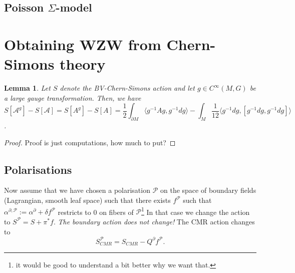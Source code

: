 \documentclass[a4paper,reqno]{amsart}
\newtheorem{lemma}[definition]{Lemma}
\newcommand{\calA}{\mathcal{A}}
\newcommand{\calP}{\mathcal{P}}
\newcommand{\de}{\partial}
\begin{document}
\subsection{Poisson $\Sigma$-model}

\section{Obtaining WZW from Chern-Simons theory}
 \begin{lemma}
 Let $S$ denote the BV-Chern-Simons action and let $g \in C^{\infty}(M,G)$ be a large gauge transformation. Then, we have $$S[\calA^g] - S[\calA] = S[A^g] - S[A] = \frac{1}{2}\int_{\de M} \langle g^{-1}Ag, g^{-1}dg \rangle -\int_M \frac{1}{12}\langle g^{-1}dg,[g^{-1}dg,g^{-1}dg]\rangle$$. 
\end{lemma}
\begin{proof}
Proof is just computations, how much to put?
\end{proof}
\subsection{Polarisations} 
Now assume that we have chosen a polarisation $\calP$ on the space of boundary fields (Lagrangian, smooth leaf space) such that there exists $f^{\calP}$ such that $\alpha^{\de,\calP} := \alpha^{\de} + \delta f^{\calP}$ restricts to 0 on fibers of $\calP$\footnote{it would be good to understand a bit better why we want that.} In that case we change the action to $S^{\calP} = S + \pi^*f$. \emph{The boundary action does not change!} The CMR action changes to 
$$S_{CMR}^{\calP} = S_{CMR} -Q^{\de}f^{\calP}.$$ 
\end{document}
